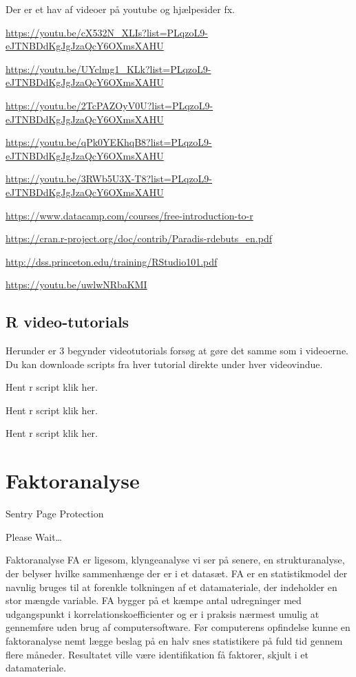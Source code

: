 \documentclass[]{book}
\begin{document}
Der er et hav af videoer på youtube og hjælpesider fx.

\url{https://youtu.be/cX532N_XLIs?list=PLqzoL9-eJTNBDdKgJgJzaQcY6OXmsXAHU}

\url{https://youtu.be/UYclmg1_KLk?list=PLqzoL9-eJTNBDdKgJgJzaQcY6OXmsXAHU}

\url{https://youtu.be/2TcPAZOyV0U?list=PLqzoL9-eJTNBDdKgJgJzaQcY6OXmsXAHU}

\url{https://youtu.be/qPk0YEKhqB8?list=PLqzoL9-eJTNBDdKgJgJzaQcY6OXmsXAHU}

\url{https://youtu.be/3RWb5U3X-T8?list=PLqzoL9-eJTNBDdKgJgJzaQcY6OXmsXAHU}

\url{https://www.datacamp.com/courses/free-introduction-to-r}

\url{https://cran.r-project.org/doc/contrib/Paradis-rdebuts_en.pdf}

\url{http://dss.princeton.edu/training/RStudio101.pdf}

\url{https://youtu.be/uwlwNRbaKMI}

\hypertarget{r-video-tutorials}{%
\section{R video-tutorials}\label{r-video-tutorials}}

Herunder er 3 begynder videotutorials forsøg at gøre det samme som i videoerne. Du kan downloade scripts fra hver tutorial direkte under hver videovindue.

Hent r script klik her.

Hent r script klik her.

Hent r script klik her.

\hypertarget{faktoranalyse}{%
\chapter{Faktoranalyse}\label{faktoranalyse}}

\hypertarget{Sentry_noJS}{}
Sentry Page Protection

\hypertarget{Sentry_redirecting}{}
Please Wait\ldots{}

Faktoranalyse FA er ligesom, klyngeanalyse vi ser på senere, en strukturanalyse, der belyser hvilke sammenhænge der er i et datasæt. FA er en statistikmodel der navnlig bruges til at forenkle tolkningen af et datamateriale, der indeholder en stor mængde variable. FA bygger på et kæmpe antal udregninger med udgangspunkt i korrelationskoefficienter og er i praksis nærmest umulig at gennemføre uden brug af computersoftware. Før computerens opfindelse kunne en faktoranalyse nemt lægge beslag på en halv snes statistikere på fuld tid gennem flere måneder. Resultatet ville være identifikation få faktorer, skjult i et datamateriale.
\end{document}

